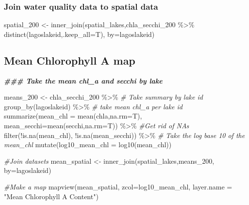\documentclass[
]{book}
\newenvironment{Shaded}{\begin{snugshade}}{\end{snugshade}}
\newcommand{\AttributeTok}[1]{\textcolor[rgb]{0.77,0.63,0.00}{#1}}
\newcommand{\CommentTok}[1]{\textcolor[rgb]{0.56,0.35,0.01}{\textit{#1}}}
\newcommand{\DocumentationTok}[1]{\textcolor[rgb]{0.56,0.35,0.01}{\textbf{\textit{#1}}}}
\newcommand{\FunctionTok}[1]{\textcolor[rgb]{0.00,0.00,0.00}{#1}}
\newcommand{\NormalTok}[1]{#1}
\newcommand{\OtherTok}[1]{\textcolor[rgb]{0.56,0.35,0.01}{#1}}
\newcommand{\SpecialCharTok}[1]{\textcolor[rgb]{0.00,0.00,0.00}{#1}}
\newcommand{\StringTok}[1]{\textcolor[rgb]{0.31,0.60,0.02}{#1}}
\begin{document}
\hypertarget{join-water-quality-data-to-spatial-data}{%
\subsubsection{Join water quality data to spatial data}\label{join-water-quality-data-to-spatial-data}}

\begin{Shaded}
\begin{Highlighting}[]
\NormalTok{spatial\_200 }\OtherTok{\textless{}{-}} \FunctionTok{inner\_join}\NormalTok{(spatial\_lakes,chla\_secchi\_200 }\SpecialCharTok{\%\textgreater{}\%}
                            \FunctionTok{distinct}\NormalTok{(lagoslakeid,}\AttributeTok{.keep\_all=}\NormalTok{T),}
                          \AttributeTok{by=}\StringTok{\textquotesingle{}lagoslakeid\textquotesingle{}}\NormalTok{)}
\end{Highlighting}
\end{Shaded}

\hypertarget{mean-chlorophyll-a-map}{%
\subsection{Mean Chlorophyll A map}\label{mean-chlorophyll-a-map}}

\begin{Shaded}
\begin{Highlighting}[]
\DocumentationTok{\#\#\# Take the mean chl\_a and secchi by lake}

\NormalTok{means\_200 }\OtherTok{\textless{}{-}}\NormalTok{ chla\_secchi\_200 }\SpecialCharTok{\%\textgreater{}\%}
  \CommentTok{\# Take summary by lake id}
  \FunctionTok{group\_by}\NormalTok{(lagoslakeid) }\SpecialCharTok{\%\textgreater{}\%}
  \CommentTok{\# take mean chl\_a per lake id}
  \FunctionTok{summarize}\NormalTok{(}\AttributeTok{mean\_chl =} \FunctionTok{mean}\NormalTok{(chla,}\AttributeTok{na.rm=}\NormalTok{T),}
            \AttributeTok{mean\_secchi=}\FunctionTok{mean}\NormalTok{(secchi,}\AttributeTok{na.rm=}\NormalTok{T)) }\SpecialCharTok{\%\textgreater{}\%}
  \CommentTok{\#Get rid of NAs}
  \FunctionTok{filter}\NormalTok{(}\SpecialCharTok{!}\FunctionTok{is.na}\NormalTok{(mean\_chl),}
         \SpecialCharTok{!}\FunctionTok{is.na}\NormalTok{(mean\_secchi)) }\SpecialCharTok{\%\textgreater{}\%}
  \CommentTok{\# Take the log base 10 of the mean\_chl}
  \FunctionTok{mutate}\NormalTok{(}\AttributeTok{log10\_mean\_chl =} \FunctionTok{log10}\NormalTok{(mean\_chl))}

\CommentTok{\#Join datasets}
\NormalTok{mean\_spatial }\OtherTok{\textless{}{-}} \FunctionTok{inner\_join}\NormalTok{(spatial\_lakes,means\_200,}
                          \AttributeTok{by=}\StringTok{\textquotesingle{}lagoslakeid\textquotesingle{}}\NormalTok{) }

\CommentTok{\#Make a map}
\FunctionTok{mapview}\NormalTok{(mean\_spatial, }\AttributeTok{zcol=}\StringTok{\textquotesingle{}log10\_mean\_chl\textquotesingle{}}\NormalTok{, }\AttributeTok{layer.name =} \StringTok{"Mean Chlorophyll A Content"}\NormalTok{)}
\end{Highlighting}
\end{Shaded}
\end{document}

